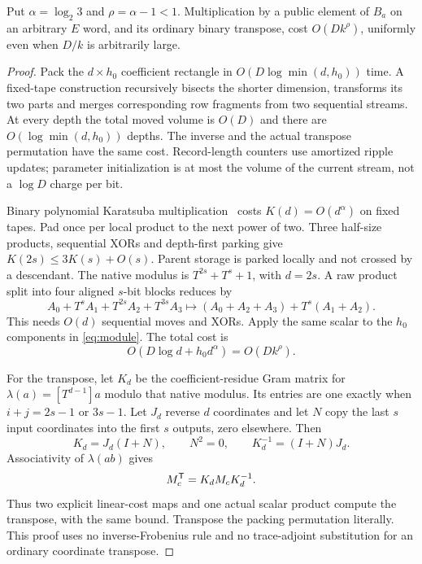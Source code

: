 \begin{lemma}\label{lem:scalar}
Put $\alpha=\log_2 3$ and $\rho=\alpha-1<1$.
Multiplication by a public element of $B_a$ on an arbitrary $E$ word,
and its ordinary binary transpose, cost $O(Dk^\rho)$, uniformly even
when $D/k$ is arbitrarily large.
\end{lemma}
\begin{proof}
Pack the $d\times h_0$ coefficient rectangle in
$O(D\log\min(d,h_0))$ time. A fixed-tape construction recursively
bisects the shorter dimension, transforms its two parts and merges
corresponding row fragments from two sequential streams. At every
depth the total moved volume is $O(D)$ and there are
$O(\log\min(d,h_0))$ depths. The inverse and the actual transpose
permutation have the same cost. Record-length counters use amortized
ripple updates; parameter initialization is at most the volume of the
current stream, not a $\log D$ charge per bit.

Binary polynomial Karatsuba multiplication~\cite{KaratsubaOfman62} costs $K(d)=O(d^\alpha)$ on fixed tapes.
Pad once per local product to the next power of two. Three half-size
products, sequential XORs and depth-first parking give
$K(2s)\leq3K(s)+O(s)$. Parent storage is parked locally and not crossed
by a descendant. The native modulus is $T^{2s}+T^s+1$, with $d=2s$.
A raw product split into four aligned $s$-bit blocks reduces by
\[
 A_0+T^sA_1+T^{2s}A_2+T^{3s}A_3
 \longmapsto (A_0+A_2+A_3)+T^s(A_1+A_2).
\]
This needs $O(d)$ sequential moves and XORs. Apply the same scalar
to the $h_0$ components in \eqref{eq:module}. The total cost is
\[
 O(D\log d+h_0d^\alpha)=O(Dk^\rho).
\]

For the transpose, let $K_d$ be the coefficient-residue Gram matrix
for $\lambda(a)=[T^{d-1}]a$ modulo that native modulus. Its entries
are one exactly when $i+j=2s-1$ or $3s-1$.
Let $J_d$ reverse $d$ coordinates and let $N$ copy the last $s$
input coordinates into the first $s$ outputs, zero elsewhere. Then
\[
 K_d=J_d(I+N),\qquad N^2=0,\qquad
 K_d^{-1}=(I+N)J_d.
\]
Associativity of $\lambda(ab)$ gives
\begin{equation}\label{eq:scalar-transpose}
 M_c^{\mathsf T}=K_d M_c K_d^{-1}.
\end{equation}
Thus two explicit linear-cost maps and one actual scalar product
compute the transpose, with the same bound. Transpose the packing
permutation literally. This proof uses no inverse-Frobenius rule and
no trace-adjoint substitution for an ordinary coordinate transpose.
\end{proof}

